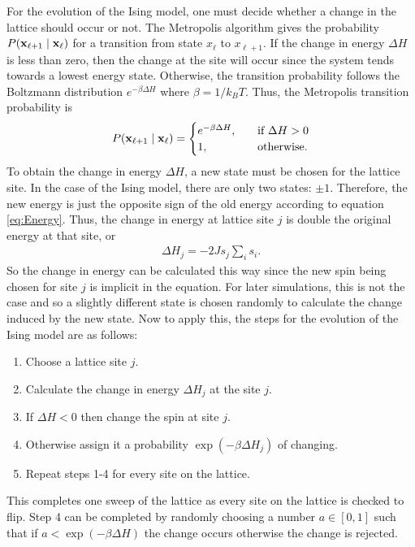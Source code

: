 \documentclass[11pt]{article}
\begin{document}
For the evolution of the Ising model, one must decide whether a change in the lattice should occur or not. The Metropolis algorithm gives the probability $P(\vb{x}_{\ell+1}\mid \vb{x}_\ell)$ for a transition from state $x_\ell$ to $x_{\ell+1}$. If the change in energy $\Delta H$ is less than zero, then the change at the site will occur since the system tends towards a lowest energy state. Otherwise, the transition probability follows the Boltzmann distribution $e^{-\beta\Delta H}$ where $\beta=1/k_BT$. Thus, the Metropolis transition probability is
\begin{align}
	P(\vb{x}_{\ell+1}\mid \vb{x}_\ell)=
	\begin{cases}
		e^{-\beta\Delta H},\quad&\text{if }\Delta H>0\\
		1,&\text{otherwise.}
	\end{cases}
	\label{eq:ProbIsing}
\end{align}
To obtain the change in energy $\Delta H$, a new state must be chosen for the lattice site. In the case of the Ising model, there are only two states: $\pm1$. Therefore, the new energy is just the opposite sign of the old energy according to equation \ref{eq:Energy}. Thus, the change in energy at lattice site $j$ is double the original energy at that site, or
\begin{align}
	\Delta H_j=-2Js_j\sum_is_i.
	\label{eq:DeltaH}
\end{align}
So the change in energy can be calculated this way since the new spin being chosen for site $j$ is implicit in the equation. For later simulations, this is not the case and so a slightly different state is chosen randomly to calculate the change induced by the new state. Now to apply this, the steps for the evolution of the Ising model are as follows:
\begin{enumerate}
\item Choose a lattice site $j$.
\item Calculate the change in energy $\Delta H_j$ at the site $j$.
\item If $\Delta H<0$ then change the spin at site $j$.
\item Otherwise assign it a probability $\exp(-\beta\Delta H_j)$ of changing.
\item Repeat steps 1-4 for every site on the lattice.
\end{enumerate}

This completes one sweep of the lattice as every site on the lattice is checked to flip. Step 4 can be completed by randomly choosing a number $a\in[0,1]$ such that if $a<\exp(-\beta\Delta H)$ the change occurs otherwise the change is rejected.
\end{document}
